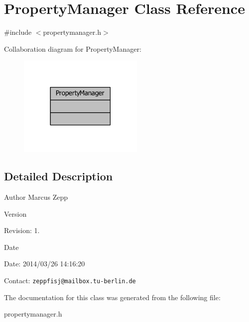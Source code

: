 \section{Property\-Manager Class Reference}
\label{classPropertyManager}


{\ttfamily \#include $<$propertymanager.\-h$>$}



Collaboration diagram for Property\-Manager\-:
\nopagebreak
\begin{figure}[H]
\begin{center}
\leavevmode
\includegraphics[width=170pt]{df/dc7/classPropertyManager__coll__graph}
\end{center}
\end{figure}


\subsection{Detailed Description}
\begin{DoxyAuthor}{Author}
Marcus Zepp
\end{DoxyAuthor}
\begin{DoxyVersion}{Version}

\end{DoxyVersion}
\begin{DoxyParagraph}{Revision\-:}
1. 
\end{DoxyParagraph}


\begin{DoxyDate}{Date}

\end{DoxyDate}
\begin{DoxyParagraph}{Date\-:}
2014/03/26 14\-:16\-:20 
\end{DoxyParagraph}


Contact\-: {\tt zeppfisj@mailbox.\-tu-\/berlin.\-de} 

The documentation for this class was generated from the following file\-:\begin{DoxyCompactItemize}
\item 
propertymanager.\-h\end{DoxyCompactItemize}
